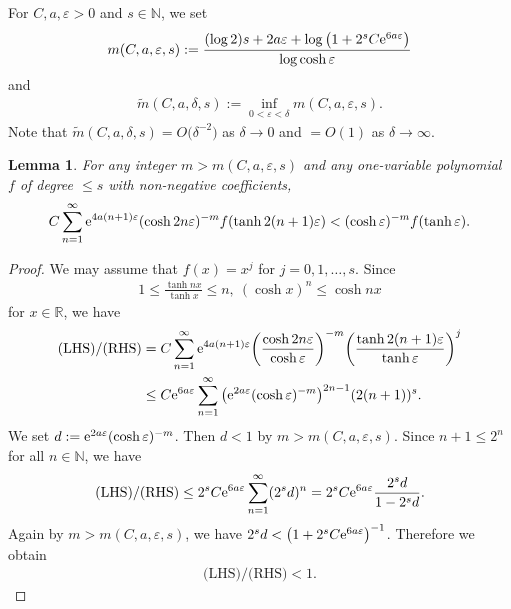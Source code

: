 \documentclass[10pt,a4paper]{amsart}
\numberwithin{equation}{section}
\newtheorem{Lemma}[Theorem]{Lemma}
\begin{document}
For $C,a,\varepsilon > 0$ and $s \in \mathbb{N}$, we set
\begin{align*}%
m(C,a,\varepsilon,s) := \frac{(\log2)s + 2a\varepsilon + \log\big(1+2^{s}C{\rm e}^{6a\varepsilon}\big)}{\log\cosh\varepsilon}
\end{align*}
and
\begin{align*}
\tilde{m}(C,a,\delta,s) :=
\inf_{0<\varepsilon<\delta}m(C,a,\varepsilon,s).
\end{align*}
Note that $\tilde{m}(C,a,\delta,s)=O\big(\delta^{-2}\big)$ as $\delta\to 0$
and $=O(1)$ as $\delta\to \infty$.
\begin{Lemma}\label{koukou}
For any integer $m > m(C,a,\varepsilon,s)$
and any one-variable polynomial $f$ of degree $\leq s$ with non-negative coefficients,
\begin{gather*}
C\sum_{n=1}^{\infty}{\rm e}^{4a(n+1)\varepsilon}(\cosh 2n\varepsilon)^{-m}f(\tanh
2(n+1)\varepsilon) < (\cosh \varepsilon)^{-m}f(\tanh \varepsilon).
\end{gather*}
\end{Lemma}
\begin{proof}
We may assume that $f(x) = x^{j}$ for $j=0,1,\ldots,s$.
Since
\begin{gather*}
1\leq \frac{\tanh nx}{\tanh x} \leq n,\
(\cosh x)^{n} \leq \cosh nx
\end{gather*}
for $x\in\mathbb{R}$, we have
\begin{align*}
\text{(LHS)/(RHS)} &=
C\sum_{n=1}^{\infty}{\rm e}^{4a(n+1)\varepsilon}\bigg(\frac{\cosh 2n
\varepsilon}{\cosh \varepsilon}\bigg)^{-m}\bigg(\frac{\tanh
2(n+1)\varepsilon}{\tanh \varepsilon}\bigg)^j \nonumber
\\
&\leq C{\rm e}^{6a\varepsilon}\sum_{n=1}^{\infty}
\big({\rm e}^{2a\varepsilon}(\cosh \varepsilon)^{-m}\big)^{2n-1}(2(n+1))^s.
\end{align*}
We set $d:={\rm e}^{2a\varepsilon}(\cosh \varepsilon)^{-m}$.
Then $d<1$ by $m>m(C,a,\varepsilon,s)$. Since $n+1\leq 2^{n}$ for all $n\in\mathbb{N}$,
we have
\begin{gather*}
\text{(LHS)/(RHS)}\leq
2^{s}C{\rm e}^{6a\varepsilon}\sum_{n=1}^{\infty} (2^{s}d)^n
= 2^{s}C{\rm e}^{6a\varepsilon}\frac{2^{s}d}{1-2^{s}d}.
\end{gather*}
Again by $m > m(C,a,\varepsilon,s)$,
we have $2^{s}d<\big(1+2^{s}C{\rm e}^{6a\varepsilon}\big)^{-1}$.
Therefore we obtain
\begin{gather*}
\text{(LHS)/(RHS)}<1.\tag*{\qed}
\end{gather*}
\renewcommand{\qed}{}
\end{proof}
\end{document}
